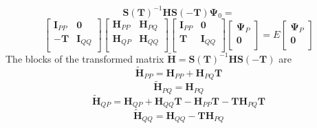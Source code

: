 \documentclass[12pt]{article}
\begin{document}
\begin{equation}
\mathbf{S}(\mathbf{T})^{-1} \mathbf{H} \mathbf{S}(-\mathbf{T})\boldsymbol{\Psi}_{0} = 
\end{equation}
\begin{equation}
\begin{bmatrix}
\mathbf{I}_{PP} & \mathbf{0} \\ 
-\mathbf{T} & \mathbf{I}_{QQ} \\ 
\end{bmatrix}
\begin{bmatrix}
 \mathbf{H}_{PP} & \mathbf{H}_{PQ} \\ 
 \mathbf{H}_{QP} & \mathbf{H}_{QQ} \\ 
\end{bmatrix} 
\begin{bmatrix}
\mathbf{I}_{PP} & \mathbf{0} \\ 
\mathbf{T} & \mathbf{I}_{QQ} \\ 
\end{bmatrix}
\begin{bmatrix}
 \boldsymbol{\Psi}_{P} \\ 
 \mathbf{0}\\ 
\end{bmatrix} 
= E 
\begin{bmatrix}
 \boldsymbol{\Psi}_{P} \\ 
 \mathbf{0}\\ 
\end{bmatrix} 
\label{eqn:TransEvalEqn}
\end{equation}
The blocks of the transformed matrix $\mathbf{\tilde{H}} = \mathbf{S}(\mathbf{T})^{-1} \mathbf{H} \mathbf{S}(-\mathbf{T})$ are
\begin{equation}
\mathbf{\tilde{H}}_{PP} = \mathbf{H}_{PP} + \mathbf{H}_{PQ}\mathbf{T}
\label{eqn:HPP}
\end{equation} 
\begin{equation}
\mathbf{\tilde{H}}_{PQ} = \mathbf{H}_{PQ}
\end{equation} 
\begin{equation}
\mathbf{\tilde{H}}_{QP} = \mathbf{H}_{QP} + \mathbf{H}_{QQ}\mathbf{T} - \mathbf{\mathbf{H}}_{PP}\mathbf{T} - \mathbf{T}\mathbf{H}_{PQ}\mathbf{T}
\label{eqn:HQP}
\end{equation} 
\begin{equation}
\mathbf{\tilde{H}}_{QQ} = \mathbf{H}_{QQ} -\mathbf{T}\mathbf{H}_{PQ}
\end{equation} 
\end{document}
